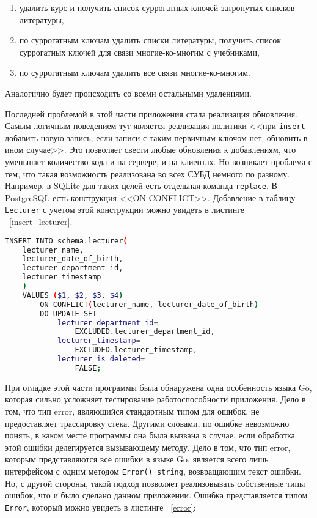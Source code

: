 \begin{enumerate}
	\item удалить курс и получить список суррогатных ключей затронутых списков литературы,
	\item по суррогатным ключам удалить списки литературы, получить список суррогатных ключей
	      для связи многие-ко-многим с учебниками,
	\item по суррогатным ключам удалить все связи многие-ко-многим.
\end{enumerate}

Аналогично будет происходить со всеми остальными удалениями.

Последней проблемой в этой части приложения стала реализация обновления. Самым логичным поведением тут
является реализация политики <<при \texttt{insert} добавить новую запись, если записи с таким первичным ключом нет, 
обновить в ином случае>>. Это позволяет свести любые обновления к добавлениям, что уменьшает количество
кода и на сервере, и на клиентах. Но возникает проблема с тем, что такая возможность реализована во всех
СУБД немного по разному. Например, в SQLite для таких целей есть отдельная команда \texttt{replace}.
В PostgreSQL есть конструкция <<ON CONFLICT>>. Добавление в таблицу \texttt{Lecturer} с учетом этой конструкции можно
увидеть в листинге ~\ref{insert_lecturer}.

\begin{lstlisting}[language=bash, caption = {SQL запрос добавления записи в таблицу Lecturer}, captionpos=b, label={insert_lecturer}]
INSERT INTO schema.lecturer(
    lecturer_name, 
    lecturer_date_of_birth,
    lecturer_department_id, 
    lecturer_timestamp
    ) 
    VALUES ($1, $2, $3, $4)
        ON CONFLICT(lecturer_name, lecturer_date_of_birth) 
        DO UPDATE SET
            lecturer_department_id=
                EXCLUDED.lecturer_department_id,
            lecturer_timestamp=
                EXCLUDED.lecturer_timestamp,
            lecturer_is_deleted=
                FALSE;
\end{lstlisting}

При отладке этой части программы была обнаружена одна особенность языка Go, которая
сильно усложняет тестирование работоспособности приложения. Дело в том, что тип 
error, являющийся стандартным типом для ошибок, не предоставляет трассировку стека. Другими словами, по ошибке невозможно понять,
в каком месте программы она была вызвана в случае, если обработка этой ошибки делегируется
вызывающему методу. Дело в том, что тип error, которым представляются все ошибки в языке
Go, является всего лишь интерфейсом с одним методом \texttt{Error() string}, возвращающим текст ошибки.
Но, с другой стороны, такой подход позволяет реализовывать собственные типы ошибок,
что и было сделано данном приложении. Ошибка представляется типом \texttt{Error}, который можно увидеть в листинге ~\ref{error}:

